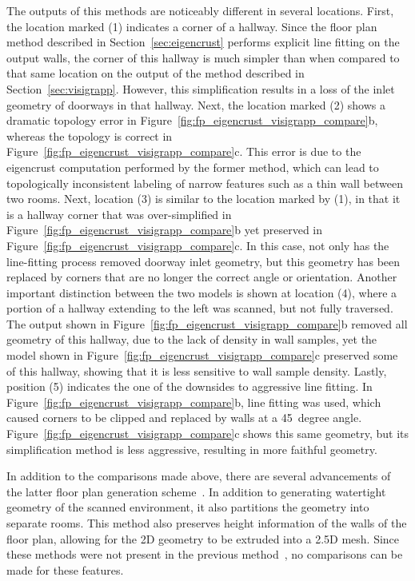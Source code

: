 \documentclass[12pt,onecolumn,oneside]{book}
\begin{document}
The outputs of this methods are noticeably different in several locations.  First, the location marked (1) indicates a corner of a hallway.  Since the floor plan method described in Section~\ref{sec:eigencrust} performs explicit line fitting on the output walls, the corner of this hallway is much simpler than when compared to that same location on the output of the method described in Section~\ref{sec:visigrapp}.  However, this simplification results in a loss of the inlet geometry of doorways in that hallway.  Next, the location marked (2) shows a dramatic topology error in Figure~\ref{fig:fp_eigencrust_visigrapp_compare}b, whereas the topology is correct in Figure~\ref{fig:fp_eigencrust_visigrapp_compare}c.  This error is due to the eigencrust computation performed by the former method, which can lead to topologically inconsistent labeling of narrow features such as a thin wall between two rooms.  Next, location (3) is similar to the location marked by (1), in that it is a hallway corner that was over-simplified in Figure~\ref{fig:fp_eigencrust_visigrapp_compare}b yet preserved in Figure~\ref{fig:fp_eigencrust_visigrapp_compare}c.  In this case, not only has the line-fitting process removed doorway inlet geometry, but this geometry has been replaced by corners that are no longer the correct angle or orientation.  Another important distinction between the two models is shown at location (4), where a portion of a hallway extending to the left was scanned, but not fully traversed.  The output shown in Figure~\ref{fig:fp_eigencrust_visigrapp_compare}b removed all geometry of this hallway, due to the lack of density in wall samples, yet the model shown in Figure~\ref{fig:fp_eigencrust_visigrapp_compare}c preserved some of this hallway, showing that it is less sensitive to wall sample density.  Lastly, position (5) indicates the one of the downsides to aggressive line fitting.  In Figure~\ref{fig:fp_eigencrust_visigrapp_compare}b, line fitting was used, which caused corners to be clipped and replaced by walls at a 45~degree angle.  Figure~\ref{fig:fp_eigencrust_visigrapp_compare}c shows this same geometry, but its simplification method is less aggressive, resulting in more faithful geometry.

In addition to the comparisons made above, there are several advancements of the latter floor plan generation scheme~\cite{Turner14}.  In addition to generating watertight geometry of the scanned environment, it also partitions the geometry into separate rooms.  This method also preserves height information of the walls of the floor plan, allowing for the 2D geometry to be extruded into a 2.5D mesh.  Since these methods were not present in the previous method~\cite{Turner12}, no comparisons can be made for these features.
\end{document}
